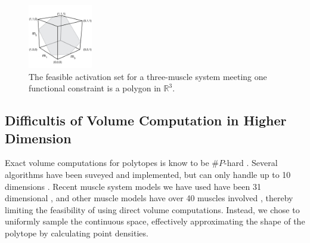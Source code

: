 \begin{figure}[ht]
  \label{fig:fig_hr}
   \begin{center}
    \includegraphics[width=0.25\textwidth]{sections/figs/feasibleactivation.png}
  \end{center}
  \caption{The feasible activation set for a  three-muscle system meeting one functional constraint is a polygon in $\mathbb{R}^3$.} %
\end{figure}

\subsection{Difficultis of Volume Computation in Higher Dimension}

Exact volume computations for polytopes is know to be $\#P$-hard \cite{Dyer}. Several algorithms have been suveyed and implemented, but can only handle up to 10 dimensions \cite{Bueler2}.  
Recent muscle system models we have used have been 31 dimensional \cite{Valero-Cuevas2015high-dimensional}, and other muscle models have over 40 muscles involved \cite{arnold2010model, kutch2012challenges, hamner2010muscle, de2014human}, thereby limiting the feasibility of using direct volume computations. Instead, we chose to uniformly sample the continuous space, effectively approximating the shape of the polytope by calculating point densities. %

